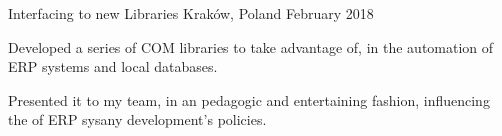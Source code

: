 \begin{cventries}
    {Interfacing to new Libraries} %
    {Kraków, Poland} %
    {February 2018} %
    {
        \begin{cvitems} %
        \item {Developed a series of COM libraries to take advantage of, in the automation of ERP
            systems and local databases.}
        \item {Presented it to my team, in an pedagogic and entertaining fashion, influencing the
            of ERP sysany development's policies.}
        \end{cvitems}
    }

\end{cventries}
